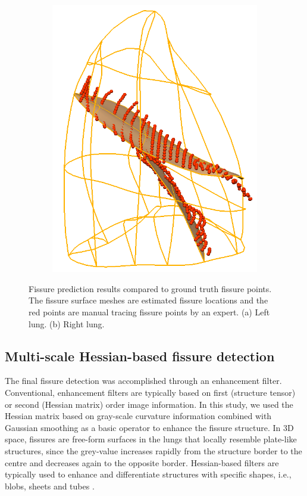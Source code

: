 {\begin{figure}[htbp]
\begin{subfigure}{.37\linewidth}
  \includegraphics[width=\linewidth,trim={{.0\wd0} {.0\wd0} {.0\wd0} {.0\wd0}},clip]{Segmentation/Image/ProjectedRightFissureMesh.png}
  \caption{}
  \label{fig:PCAFissurePrediction-b} 
\end{subfigure}
\caption{Fissure prediction results compared to ground truth fissure points. The fissure surface meshes are estimated fissure locations and the red points are manual tracing fissure points by an expert. (a) Left lung. (b) Right lung.}
\label{fig:PCAFissurePrediction}
\end{figure}
\subsection{Multi-scale Hessian-based fissure detection}

The final fissure detection was accomplished through an enhancement filter. Conventional, enhancement filters are typically based on first (structure tensor) or second (Hessian matrix) order image information. In this study, we used the Hessian matrix based on gray-scale curvature information combined with Gaussian smoothing as a basic operator to enhance the fissure structure. In 3D space, fissures are free-form surfaces in the lungs that locally resemble plate-like structures, since the grey-value increases rapidly from the structure border to the centre and decreases again to the opposite border. Hessian-based filters are typically used to enhance and differentiate structures with specific shapes, i.e., blobs, sheets and tubes \citep{frangi1998multiscale,lorenz1997multi}.

}

